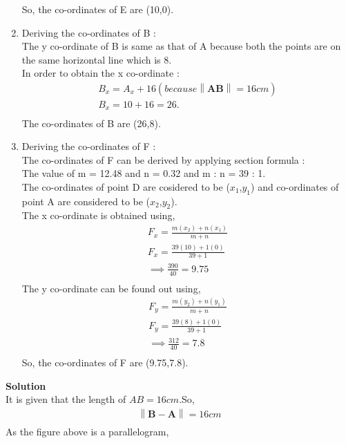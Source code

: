 \documentclass{article}
\providecommand{\norm}[1]{\left\lVert#1\right\rVert}
\let\vec\mathbf
\begin{document}
\begin{enumerate}
\begin{center}
		\end{center}
So, the co-ordinates of E are (10,0).
\item Deriving the co-ordinates of B : \\
	The y co-ordinate of B is same as that of A because both the points are on the same horizontal line which is 8.\\
In order to obtain the x co-ordinate :
		\begin{align}
			B_x = A_x + 16(because \norm{\vec{AB}} = 16cm)\\
			B_x = 10 +16 = 26.\\
		\end{align}
The co-ordinates of B are (26,8).\\
\item Deriving the co-ordinates of F :\\
The co-ordinates of F can be derived by applying section formula : \\
The value of m = 12.48 and n = 0.32 and m : n = 39 : 1.\\
The co-ordinates of point D are cosidered to be ($x_1$,$y_1$) and co-ordinates of point A are considered to be ($x_2$,$y_2$).\\
The x co-ordinate is obtained using, \\
		\begin{align}
			F_x = \frac{m(x_2) + n(x_1)}{m + n}\\
			F_x = \frac{39(10) + 1(0)}{39 + 1}\\
			\implies \frac{390}{40} = 9.75\\
		\end{align}
The y co-ordinate can be found out using, \\
		\begin{align}
			F_y = \frac{m(y_2) + n(y_1)}{m + n}\\
			F_y = \frac{39(8) + 1(0)}{39 + 1}\\
			\implies \frac{312}{40} = 7.8 \\
		\end{align}
So, the co-ordinates of F are (9.75,7.8).
\end{enumerate}
\textbf{Solution}\\
It is given that the length of $AB = 16cm$.So,\\
\begin{align}
	\norm{\vec{B} - \vec{A}} = 16cm \\
\end{align}
As the figure above is a parallelogram,\\
\end{document}
